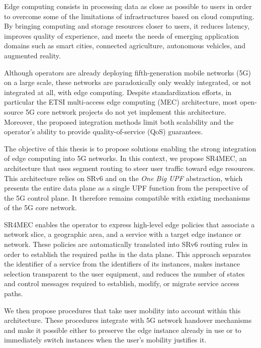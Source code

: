 \documentclass[../main.tex]{subfiles}
\begin{document}
\begin{resume}
\begin{enresume}
Edge computing consists in processing data as close as possible to users in order to overcome some of the limitations of infrastructures based on cloud computing. By bringing computing and storage resources closer to users, it reduces latency, improves quality of experience, and meets the needs of emerging application domains such as smart cities, connected agriculture, autonomous vehicles, and augmented reality.

Although operators are already deploying fifth-generation mobile networks (5G) on a large scale, these networks are paradoxically only weakly integrated, or not integrated at all, with edge computing. Despite standardization efforts, in particular the ETSI multi-access edge computing (MEC) architecture, most open-source 5G core network projects do not yet implement this architecture. Moreover, the proposed integration methods limit both scalability and the operator’s ability to provide quality-of-service (QoS) guarantees.

The objective of this thesis is to propose solutions enabling the strong integration of edge computing into 5G networks. In this context, we propose SR4MEC, an architecture that uses segment routing to steer user traffic toward edge resources. This architecture relies on SRv6 and on the \textit{One Big UPF} abstraction, which presents the entire data plane as a single UPF function from the perspective of the 5G control plane. It therefore remains compatible with existing mechanisms of the 5G core network.

SR4MEC enables the operator to express high-level edge policies that associate a network slice, a geographic area, and a service with a target edge instance or network. These policies are automatically translated into SRv6 routing rules in order to establish the required paths in the data plane. This approach separates the identifier of a service from the identifiers of its instances, makes instance selection transparent to the user equipment, and reduces the number of states and control messages required to establish, modify, or migrate service access paths.

We then propose procedures that take user mobility into account within this architecture. These procedures integrate with 5G network handover mechanisms and make it possible either to preserve the edge instance already in use or to immediately switch instances when the user’s mobility justifies it.


\end{enresume}
\end{resume}
\end{document}
